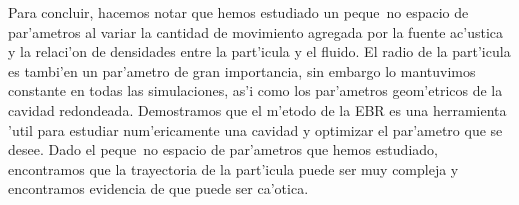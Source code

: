 Para concluir, hacemos notar que hemos estudiado un peque~no espacio de par'ametros al variar la cantidad
de movimiento agregada por la fuente ac'ustica y la relaci'on de densidades entre la part'icula y el fluido.
El radio de la part'icula es tambi'en un par'ametro de gran importancia, sin embargo lo mantuvimos constante
en todas las simulaciones, as'i como los par'ametros geom'etricos de la cavidad redondeada. Demostramos 
que el m'etodo de la EBR es una herramienta 'util para estudiar num'ericamente una cavidad y optimizar el
par'ametro que se desee. Dado el peque~no espacio de par'ametros que hemos estudiado, encontramos que la
trayectoria de la part'icula puede ser muy compleja y encontramos evidencia de que puede ser ca'otica.
